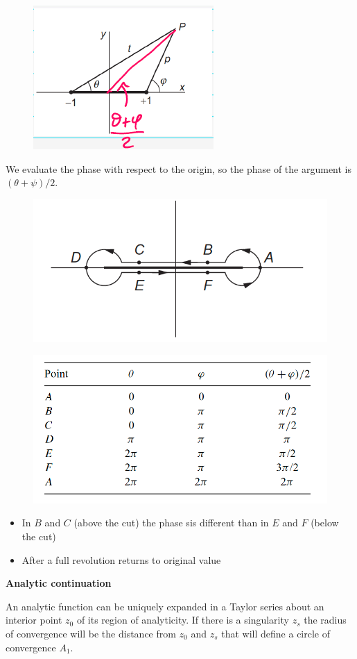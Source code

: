 \documentclass{article}
\begin{document}
\begin{figure}[h]
    \centering
    \includegraphics[width=0.35\linewidth]{fig25.png}
\end{figure}

\newpage

\noindent
We evaluate the phase with respect to the origin, so the phase of the argument is $(\theta + \psi)/2$.

\begin{figure}[h]
    \centering
    \includegraphics[width=0.4\linewidth]{fig26.png}
\end{figure}

\begin{figure}[h]
    \centering
    \includegraphics[width=0.5\linewidth]{fig27.png}
\end{figure}

\begin{itemize}
    \item In $B$ and $C$ (above the cut) the phase sis different than in $E$ and $F$ (below the cut)
    \item After a full revolution returns to original value
\end{itemize}

\noindent
\textbf{Analytic continuation}

\noindent
An analytic function can be uniquely expanded in a Taylor series about an interior point $z_0$ of its region of analyticity. If there is a singularity $z_s$ the radius of convergence will be the distance from $z_0$ and $z_s$ that will define a circle of convergence $A_1$.
\end{document}

